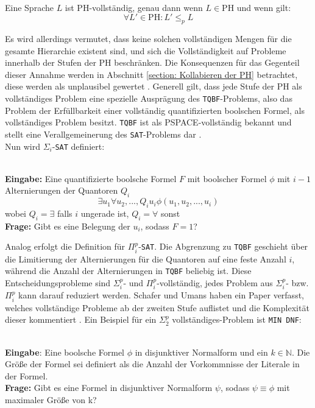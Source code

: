 \begin{definition}[PH-Vollständigkeit] \cite[S.99]{arora_computational_2009} \\
    Eine Sprache $L$ ist PH-vollständig, genau dann wenn $L \in \text{PH}$ und wenn gilt: 
    \begin{equation}
    \forall L' \in \text{PH} : L' \leq_p L
    \end{equation}
\end{definition}

Es wird allerdings vermutet, dass keine solchen vollständigen Mengen für die gesamte Hierarchie existent sind, und sich die Vollständigkeit auf Probleme innerhalb der
Stufen der PH beschränken. Die Konsequenzen für das Gegenteil dieser Annahme werden in Abschnitt \ref{section: Kollabieren der PH} betrachtet, diese werden als unplausibel gewertet \cite{arora_computational_2009}.
Generell gilt, dass jede Stufe der PH als vollständiges Problem eine spezielle Ausprägung des \texttt{TQBF}-Problems, also das Problem der Erfüllbarkeit einer vollständig quantifizierten boolschen Formel, als vollständiges Problem besitzt.
\texttt{TQBF} ist als PSPACE-vollständig bekannt und stellt eine Verallgemeinerung des \texttt{SAT}-Problems dar \cite{arora_computational_2009}. \\
Nun wird $\Sigma_i$-\texttt{SAT} definiert:
\begin{definition} \cite[S.99]{arora_computational_2009} \\
    \textbf{Eingabe:} Eine quantifizierte boolsche Formel $F$ mit boolscher Formel $\phi$ mit $i-1$ Alternierungen der Quantoren $Q_i$ 
    $$
    \exists u_1 \forall u_2, ..., Q_i u_i \phi(u_1, u_2, ..., u_i)
    $$
    wobei $Q_i = \exists $ falls $i$ ungerade ist, $Q_i = \forall$ sonst \\
    \textbf{Frage:} Gibt es eine Belegung der $u_i$, sodass $F = 1$?
\end{definition}

Analog erfolgt die Definition für $\Pi^p_i$-\texttt{SAT}. Die Abgrenzung zu \texttt{TQBF} geschieht über die Limitierung der Alternierungen für die Quantoren auf eine feste Anzahl $i$, während 
die Anzahl der Alternierungen in \texttt{TQBF} beliebig ist.
Diese Entscheidungsprobleme sind $\Sigma^p_i$- und $\Pi^p_i$-vollständig, jedes Problem aus $\Sigma^p_i$- bzw. $\Pi^p_i$ kann darauf reduziert werden.
Schafer und Umans haben ein Paper verfasst, welches vollständige Probleme ab der zweiten Stufe auflistet und die Komplexität dieser kommentiert \cite{schaefer_completeness_nodate}.
Ein Beispiel für ein $\Sigma^p_2$ vollständiges-Problem ist \texttt{MIN DNF}:
\begin{definition} \cite[S.4]{schaefer_completeness_nodate} \\
    \textbf{Eingabe}: Eine boolsche Formel $\phi$ in disjunktiver Normalform und ein $k \in \mathbb{N}$.
    Die Größe der Formel sei definiert als die Anzahl der Vorkommnisse der Literale in der Formel. \\
    \textbf{Frage:} Gibt es eine Formel in disjunktiver Normalform $\psi$, sodass $\psi \equiv \phi$ mit maximaler Größe von k?  
\end{definition}


